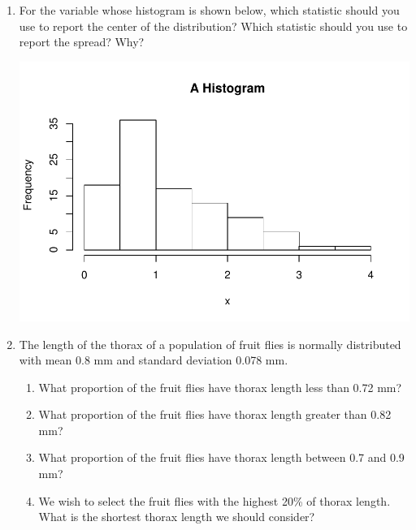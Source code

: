 \documentclass[12pt,fullpage]{amsart}
\begin{document}
\begin{enumerate}
\item For the variable whose histogram is shown below, which statistic should you use to report the center of the distribution?  Which statistic should you use to report the spread? Why?

\includegraphics[scale=0.5]{RightSkew}


\item The length of the thorax of a population of fruit flies is
  normally distributed with mean 0.8 mm and standard deviation 0.078
  mm.
  \begin{enumerate}
  \item What proportion of the fruit flies have thorax length less
    than 0.72 mm?
  \item What proportion of the fruit flies have thorax length greater
    than 0.82 mm?
  \item What proportion of the fruit flies have thorax length between
    0.7 and 0.9 mm?
  \item We wish to select the fruit flies with the highest 20\% of
    thorax length.  What is the shortest thorax length we should
    consider?
  \end{enumerate}

 \newpage
 


\end{enumerate}
\end{document}

